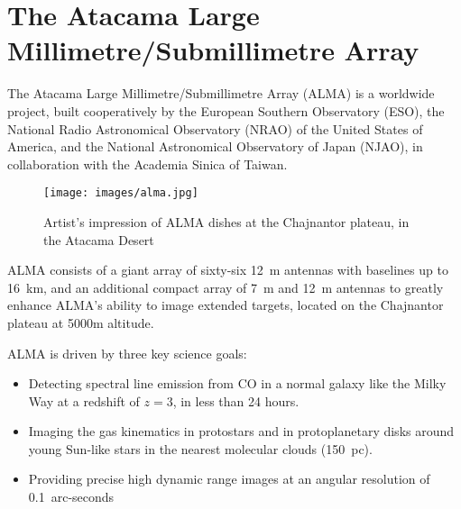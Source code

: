 \section{The Atacama Large Millimetre/Submillimetre Array}

The Atacama Large Millimetre/Submillimetre Array (ALMA) %
is a worldwide project, %
built cooperatively by the European Southern Observatory (ESO), the National Radio Astronomical Observatory (NRAO) of the United States of America, and the National Astronomical Observatory of Japan (NJAO), in collaboration with the Academia Sinica of Taiwan.

 \begin{figure}[tb]
 \centering
 \texttt{[image: images/alma.jpg]}
 \caption{Artist's impression of ALMA dishes at the Chajnantor plateau, in the Atacama Desert}
 \end{figure}


ALMA
consists of a giant array of
sixty-six
12~m antennas with baselines up to
16~km,
and an additional compact array of
7~m
and
12~m antennas to greatly enhance ALMA's ability to image extended targets, located on the Chajnantor plateau at 5000m altitude.

ALMA is driven by three key science goals:

\begin{itemize}

\item Detecting spectral line emission from CO in a normal galaxy like the Milky Way at a redshift of $z=3$, in less than 24 hours.

\item Imaging the gas kinematics in protostars and in protoplanetary disks around young Sun-like stars in the nearest molecular clouds
(150~pc).

\item Providing precise high dynamic range images at an angular resolution of
0.1~arc-seconds
\end{itemize}

